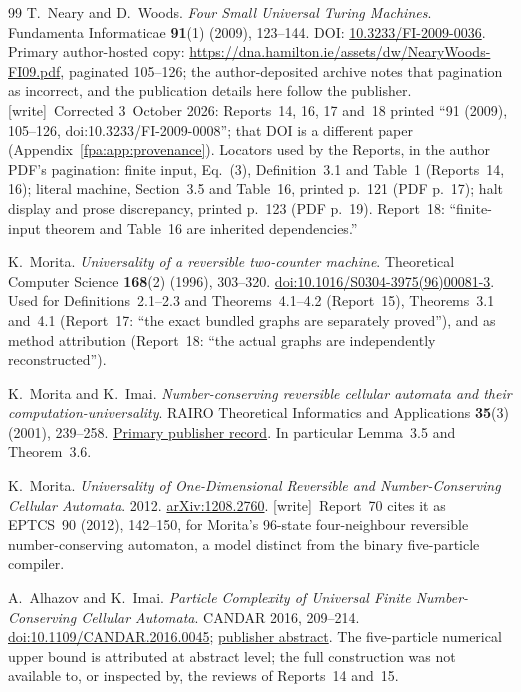 \documentclass[11pt,a4paper]{article}
\newcommand{\fpaheadR}{Front matter}
\numberwithin{equation}{section}
\newcommand{\wtag}{\textup{[write]}}
\begin{document}
\clearpage
\renewcommand{\fpaheadR}{References}
\begin{thebibliography}{99}
T.~Neary and D.~Woods. \emph{Four Small Universal Turing Machines}. Fundamenta Informaticae \textbf{91}(1) (2009), 123--144. DOI: \href{https://doi.org/10.3233/FI-2009-0036}{10.3233/FI-2009-0036}. Primary author-hosted copy: \url{https://dna.hamilton.ie/assets/dw/NearyWoods-FI09.pdf}, paginated 105--126; the author-deposited archive notes that pagination as incorrect, and the publication details here follow the publisher. \wtag\ Corrected 3~October 2026: Reports~14, 16, 17 and~18 printed ``91 (2009), 105--126, doi:10.3233/FI-2009-0008''; that DOI is a different paper (Appendix~\ref{fpa:app:provenance}). Locators used by the Reports, in the author PDF's pagination: finite input, Eq.~(3), Definition~3.1 and Table~1 (Reports~14, 16); literal machine, Section~3.5 and Table~16, printed p.~121 (PDF p.~17); halt display and prose discrepancy, printed p.~123 (PDF p.~19). Report~18: ``finite-input theorem and Table~16 are inherited dependencies.''

K.~Morita. \emph{Universality of a reversible two-counter machine}. Theoretical Computer Science \textbf{168}(2) (1996), 303--320. \href{https://doi.org/10.1016/S0304-3975(96)00081-3}{doi:10.1016/S0304-3975(96)00081-3}. Used for Definitions~2.1--2.3 and Theorems~4.1--4.2 (Report~15), Theorems~3.1 and~4.1 (Report~17: ``the exact bundled graphs are separately proved''), and as method attribution (Report~18: ``the actual graphs are independently reconstructed'').

K.~Morita and K.~Imai. \emph{Number-conserving reversible cellular automata and their computation-universality}. RAIRO Theoretical Informatics and Applications \textbf{35}(3) (2001), 239--258. \href{https://www.numdam.org/item/ITA_2001__35_3_239_0/}{Primary publisher record}. In particular Lemma~3.5 and Theorem~3.6.

K.~Morita. \emph{Universality of One-Dimensional Reversible and Number-Conserving Cellular Automata}. 2012. \href{https://arxiv.org/abs/1208.2760}{arXiv:1208.2760}. \wtag\ Report~70 cites it as EPTCS~90 (2012), 142--150, for Morita's 96-state four-neighbour reversible number-conserving automaton, a model distinct from the binary five-particle compiler.

A.~Alhazov and K.~Imai. \emph{Particle Complexity of Universal Finite Number-Conserving Cellular Automata}. CANDAR 2016, 209--214. \href{https://doi.org/10.1109/CANDAR.2016.0045}{doi:10.1109/CANDAR.2016.0045}; \href{https://ieeexplore.ieee.org/document/7818615}{publisher abstract}. The five-particle numerical upper bound is attributed at abstract level; the full construction was not available to, or inspected by, the reviews of Reports~14 and~15.


\end{thebibliography}
\end{document}
